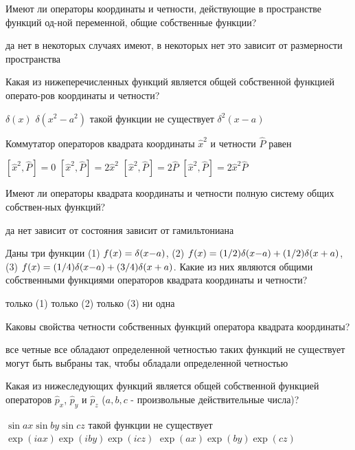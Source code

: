 \documentclass[11pt,a4paper]{exam}
\begin{document}
\begin{questions}
\question Имеют ли операторы координаты и четности, действующие в пространстве функций од-ной переменной, общие собственные функции?
\begin{choices}
\choice да
\choice нет
\choice в некоторых случаях имеют, в некоторых нет
\choice это зависит от размерности пространства
\end{choices}

\question Какая из нижеперечисленных функций является общей собственной функцией операто-ров координаты и четности?
\begin{choices}
\choice $\delta (x)$    
\choice $\delta ({x^2} - {a^2})$    
\choice такой функции не существует    
\choice ${\delta ^2}(x - a)$
\end{choices}

\question Коммутатор операторов квадрата координаты ${\hat x^2}$ и четности $\hat P$ равен
\begin{choices}
\choice $\left[ {{{\hat x}^2},\hat P} \right] = 0$    
\choice $\left[ {{{\hat x}^2},\hat P} \right] = 2{\hat x^2}$      
\choice $\left[ {{{\hat x}^2},\hat P} \right] = 2\hat P$    
\choice $\left[ {{{\hat x}^2},\hat P} \right] = 2{\hat x^2}\hat P$
\end{choices}

\question Имеют ли операторы квадрата координаты и четности полную систему общих собствен-ных функций?
\begin{choices}
\choice да     
\choice нет    
\choice зависит от состояния     
\choice зависит от гамильтониана
\end{choices}

\question Даны три функции
(1) $f(x) = \delta (x{\rm{ - }}a)$, (2) $f(x) = (1/2)\delta (x{\rm{ - }}a) + (1/2)\delta (x + a)$, (3) $f(x) = (1/4)\delta (x{\rm{ - }}a) + (3/4)\delta (x + a)$. 
Какие из них являются общими собственными функциями операторов квадрата координаты и четности?
\begin{choices}
\choice только (1)      
\choice только (2)      
\choice только (3)      
\choice ни одна
\end{choices}

\question Каковы свойства четности собственных функций оператора квадрата координаты?
\begin{choices}
\choice все четные
\choice все обладают определенной четностью
\choice таких функций не существует
\choice могут быть выбраны так, чтобы обладали определенной четностью
\end{choices}

\question Какая из нижеследующих функций является общей собственной функцией операторов ${\hat p_x}$, ${\hat p_y}$ и ${\hat p_z}$ ($a,b,c$ - произвольные действительные числа)?
\begin{choices}
\choice $\sin ax\sin by\sin cz$           
\choice такой функции не существует
\choice $\exp (iax)\exp (iby)\exp (icz)$        
\choice $\exp (ax)\exp (by)\exp (cz)$ 
\end{choices}


\end{questions}
\end{document}
